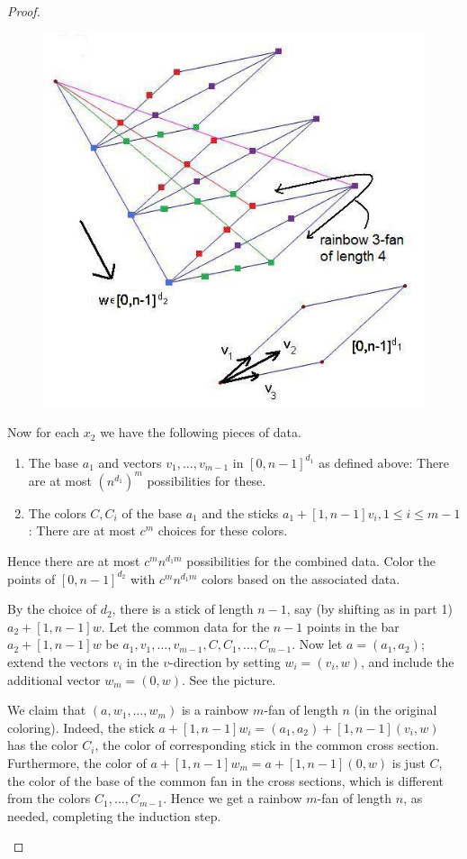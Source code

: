 \begin{proof}
\begin{enumerate}
\begin{figure}[h!]\centering
\includegraphics{hales-jewett}
\end{figure}

Now for each $x_2$ we have the following pieces of data.
\begin{enumerate}
\item
The base $a_1$ and vectors $v_1,\ldots, v_{m-1}$ in $[0,n-1]^{d_1}$ as defined above: There are at most $(n^{d_1})^m$ possibilities for these.
\item
The colors $C, C_i$ of the base $a_1$ and the sticks $a_1+[1,n-1]v_i,1\leq i\leq m-1$: There are at most $c^m$ choices for these colors.
\end{enumerate}
Hence there are at most $c^mn^{d_1m}$ possibilities for the combined data. Color the points of $[0,n-1]^{d_2}$ with $c^mn^{d_1m}$ colors based on the associated data. 

By the choice of $d_2$, there is a stick of length $n-1$, say (by shifting as in part 1) $a_2+[1,n-1]w$.  
Let the common data for the $n-1$ points in the bar $a_2+[1,n-1]w$ be $a_1,v_1,\ldots, v_{m-1}, C, C_1,\ldots, C_{m-1}$. Now let $a=(a_1,a_2)$; extend the vectors $v_i$ in the $v$-direction by setting $w_i=(v_i,w)$, and include the additional vector $w_m=(0,w)$. See the picture.

We claim that $(a,w_1,\ldots, w_m)$ is a rainbow $m$-fan of length $n$ (in the original coloring). Indeed, the stick $a+[1,n-1]w_i=(a_1,a_2)+[1,n-1](v_i,w)$ has the color $C_i$, the color of corresponding stick in the common cross section. Furthermore, the color of $a+[1,n-1]w_m=a+[1,n-1](0,w)$ is just $C$, the color of the base of the common fan in the cross sections, which is different from the colors $C_1,\ldots, C_{m-1}$. Hence we get a rainbow $m$-fan of length $n$, as needed, completing the induction step.
\end{enumerate}
\end{proof}

